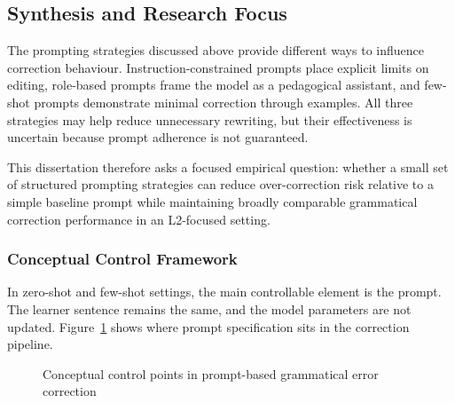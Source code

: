 \subsection{Synthesis and Research Focus}

The prompting strategies discussed above provide different ways to influence correction behaviour. Instruction-constrained prompts place explicit limits on editing, role-based prompts frame the model as a pedagogical assistant, and few-shot prompts demonstrate minimal correction through examples. All three strategies may help reduce unnecessary rewriting, but their effectiveness is uncertain because prompt adherence is not guaranteed.

This dissertation therefore asks a focused empirical question: whether a small set of structured prompting strategies can reduce over-correction risk relative to a simple baseline prompt while maintaining broadly comparable grammatical correction performance in an L2-focused setting.

\subsubsection*{Conceptual Control Framework}

In zero-shot and few-shot settings, the main controllable element is the prompt. The learner sentence remains the same, and the model parameters are not updated. Figure~\ref{fig:prompt_pipeline} shows where prompt specification sits in the correction pipeline.

\begin{figure}[htbp]
\centering
{}
\caption{Conceptual control points in prompt-based grammatical error correction}
\label{fig:prompt_pipeline}
\end{figure}

